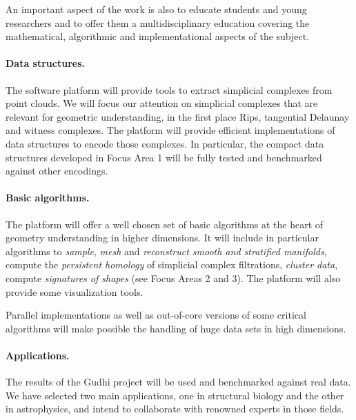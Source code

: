 An important aspect of the work is also to educate students and young
researchers and to offer them a multidisciplinary education covering
the mathematical, algorithmic and implementational aspects of the subject.


\paragraph{Data structures.}
The software platform will provide tools to extract simplicial
complexes from point clouds. We will focus our attention on simplicial
complexes that are relevant for geometric understanding, in the first
place Rips,
tangential Delaunay and witness complexes.  The platform will provide
efficient implementations of data structures to encode those
complexes. In particular, the compact data structures developed in
Focus Area 1 will be fully tested and benchmarked against other
encodings.

\paragraph{Basic algorithms.}
The platform will offer a well chosen set of basic algorithms at the
heart of geometry understanding in higher dimensions. It will include
in particular algorithms to {\em sample}, {\em mesh} and {\em
reconstruct smooth and stratified manifolds}, compute the {\em persistent homology} of
simplicial complex filtrations, {\em cluster data}, compute {\em
signatures of shapes} (see Focus Areas 2 and 3). The platform will
also provide some visualization tools.


Parallel implementations as well as out-of-core versions of some
critical algorithms %
will make possible the handling of huge data sets in high dimensions.

\paragraph{Applications.}
The results of the Gudhi project will be used and benchmarked against
real data. We have selected two main applications, one in structural
biology and the other in astrophysics, and intend to
collaborate with renowned experts in those fields. 


